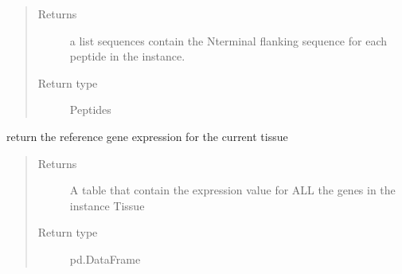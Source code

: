 \documentclass[letterpaper,10pt,english]{sphinxmanual}
\begin{document}
\begin{fulllineitems}
\begin{fulllineitems}
\begin{quote}
\begin{description}
\item[{Returns}] \leavevmode
a list sequences contain the N\sphinxhyphen{}terminal flanking sequence for each peptide in the instance.

\item[{Return type}] \leavevmode
Peptides

\end{description}\end{quote}

\end{fulllineitems}


\begin{fulllineitems}
\label{\detokenize{IPTK.Classes:IPTK.Classes.Experiment.Experiment.get_experiment_reference_tissue_expression}}
return the reference gene expression for the current tissue
\begin{quote}\begin{description}
\item[{Returns}] \leavevmode
A table that contain the expression value for ALL the genes in the instance Tissue

\item[{Return type}] \leavevmode
pd.DataFrame

\end{description}\end{quote}

\end{fulllineitems}



\end{fulllineitems}
\end{document}
